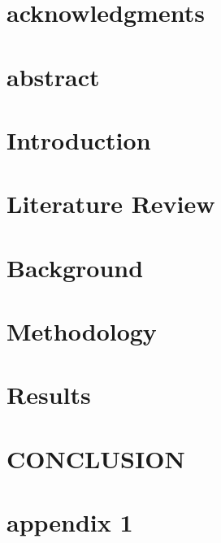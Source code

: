\documentclass[12pt, twoside, openright]{report}
\begin{document}
	
	
	
	\chapter*{acknowledgments}
	
	\newpage
	
	\chapter*{abstract}
	
	
	
	\tableofcontents
	\listoffigures
	
	\chapter{Introduction}
	
	
	\chapter{Literature Review}
	
	
	\chapter{Background}
	
	
	\chapter{Methodology}
	
	
	\chapter{Results}
	
	
	\chapter{CONCLUSION}
	
	
	\appendix
	\chapter{appendix 1}
	
	
	
	
\end{document}
